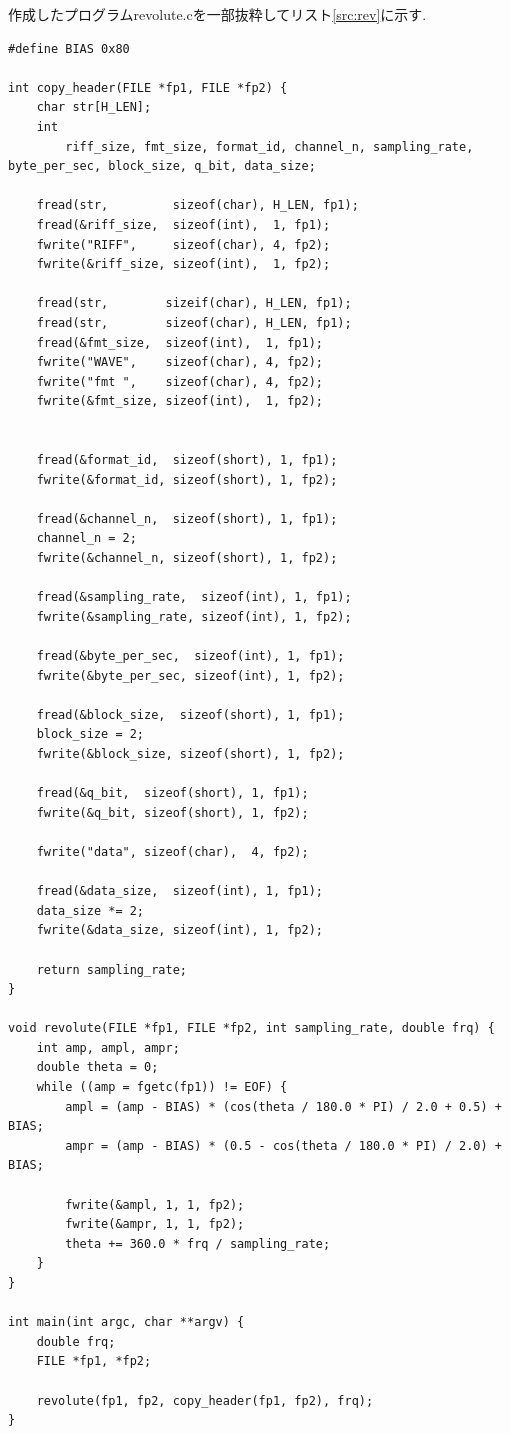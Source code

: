 \documentclass[titlepage]{jsarticle}
\begin{document}
    作成したプログラムrevolute.cを一部抜粋してリスト\ref{src:rev}に示す.
    
    \begin{lstlisting}[caption=revolute.c, label=src:rev]
#define BIAS 0x80

int copy_header(FILE *fp1, FILE *fp2) {
    char str[H_LEN];
    int
        riff_size, fmt_size, format_id, channel_n, sampling_rate, byte_per_sec, block_size, q_bit, data_size;

    fread(str,         sizeof(char), H_LEN, fp1);
    fread(&riff_size,  sizeof(int),  1, fp1);
    fwrite("RIFF",     sizeof(char), 4, fp2);
    fwrite(&riff_size, sizeof(int),  1, fp2);

    fread(str,        sizeif(char), H_LEN, fp1);
    fread(str,        sizeof(char), H_LEN, fp1);
    fread(&fmt_size,  sizeof(int),  1, fp1);
    fwrite("WAVE",    sizeof(char), 4, fp2);
    fwrite("fmt ",    sizeof(char), 4, fp2);
    fwrite(&fmt_size, sizeof(int),  1, fp2);


    fread(&format_id,  sizeof(short), 1, fp1);
    fwrite(&format_id, sizeof(short), 1, fp2);

    fread(&channel_n,  sizeof(short), 1, fp1);
    channel_n = 2;
    fwrite(&channel_n, sizeof(short), 1, fp2);

    fread(&sampling_rate,  sizeof(int), 1, fp1);
    fwrite(&sampling_rate, sizeof(int), 1, fp2);

    fread(&byte_per_sec,  sizeof(int), 1, fp1);
    fwrite(&byte_per_sec, sizeof(int), 1, fp2);

    fread(&block_size,  sizeof(short), 1, fp1);
    block_size = 2;
    fwrite(&block_size, sizeof(short), 1, fp2);

    fread(&q_bit,  sizeof(short), 1, fp1);
    fwrite(&q_bit, sizeof(short), 1, fp2);

    fwrite("data", sizeof(char),  4, fp2);

    fread(&data_size,  sizeof(int), 1, fp1);
    data_size *= 2;
    fwrite(&data_size, sizeof(int), 1, fp2);

    return sampling_rate;
}

void revolute(FILE *fp1, FILE *fp2, int sampling_rate, double frq) {
    int amp, ampl, ampr;
    double theta = 0;
    while ((amp = fgetc(fp1)) != EOF) {
        ampl = (amp - BIAS) * (cos(theta / 180.0 * PI) / 2.0 + 0.5) + BIAS;
        ampr = (amp - BIAS) * (0.5 - cos(theta / 180.0 * PI) / 2.0) + BIAS;

        fwrite(&ampl, 1, 1, fp2);
        fwrite(&ampr, 1, 1, fp2);
        theta += 360.0 * frq / sampling_rate;
    }
}

int main(int argc, char **argv) {
    double frq;
    FILE *fp1, *fp2;

    revolute(fp1, fp2, copy_header(fp1, fp2), frq);
}\end{lstlisting}
\end{document}
